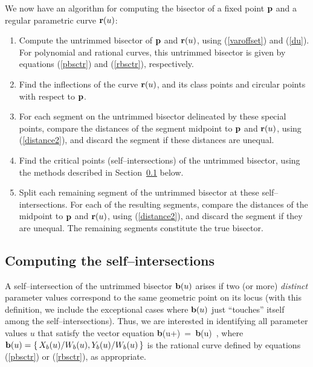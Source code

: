 We now have an algorithm for computing the bisector of a fixed point
${\bf p}$ and a regular parametric curve ${\bf r}(u)$:

\begin{enumerate}
\item
        Compute the untrimmed bisector of ${\bf p}$ and ${\bf r}(u)$,
        using (\ref{varoffset}) and (\ref{du}). For polynomial and
        rational curves, this untrimmed bisector is given by equations
        (\ref{pbsctr}) and (\ref{rbsctr}), respectively.
\item
        Find the inflections of the curve ${\bf r}(u)$, and its class
        points and circular points with respect to ${\bf p}$.
\item
        For each segment on the untrimmed bisector delineated by these
        special points, compare the distances of the segment midpoint
        to ${\bf p}$ and ${\bf r}(u)$, using (\ref{distance2}), and
        discard the segment if these distances are unequal.
\item
        Find the critical points (self--intersections) of the untrimmed
        bisector, using the methods described in Section~\ref{sec:slfint}
        below.
\item
        Split each remaining segment of the untrimmed bisector at these
        self--intersections. For each of the resulting segments, compare
        the distances of the midpoint to ${\bf p}$ and ${\bf r}(u)$,
        using (\ref{distance2}), and discard the segment if they are
        unequal. The remaining segments constitute the true bisector.
\end{enumerate}

\subsection{Computing the self--intersections}
\label{sec:slfint}

A self--intersection of the untrimmed bisector ${\bf b}(u)$ arises
if two (or more) {\it distinct\/} parameter values correspond to the
same geometric point on its locus (with this definition, we include
the exceptional cases where ${\bf b}(u)$ just ``touches'' itself among
the self--intersections). Thus, we are interested in identifying all
parameter values $u$ that satisfy the vector equation
\be \label{selfint}
{\bf b}(u+\xi) \,=\, {\bf b}(u)  \xi{} \,,
\ee
where ${\bf b}(u)=\{\,X_b(u)/W_b(u),Y_b(u)/W_b(u)\,\}$ is the rational
curve defined by equations (\ref{pbsctr}) or (\ref{rbsctr}), as
appropriate.

